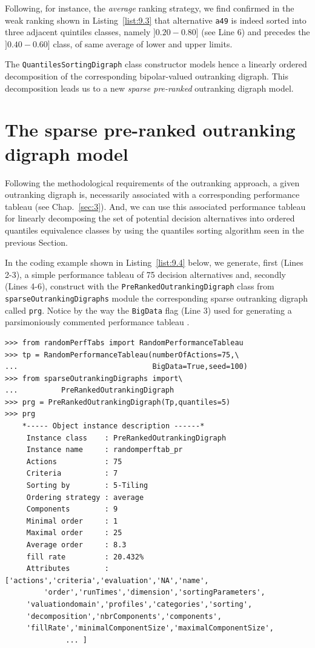 Following, for instance, the \emph{average} ranking strategy, we find confirmed in the weak ranking shown in Listing~\vref{list:9.3}  that alternative \texttt{a49}  is indeed sorted into three adjacent quintiles classes, namely $]0.20-0.80]$ (see Line 6) and precedes the $]0.40-0.60]$ class, of same average of lower and upper limits.

The \texttt{QuantilesSortingDigraph} class constructor models hence a linearly ordered decomposition of the corresponding bipolar-valued outranking digraph. This decomposition leads us to a new \emph{sparse pre-ranked} outranking digraph model.

\section{The sparse pre-ranked outranking digraph model}
\label{sec:9.3}

Following the methodological requirements of the outranking approach, a given outranking digraph is, necessarily associated with a corresponding performance tableau (see Chap.~\ref{sec:3}). And, we can use this associated performance tableau for linearly decomposing the set of potential decision alternatives into ordered quantiles equivalence classes by using the quantiles sorting algorithm seen in the previous Section. 

In the coding example shown in Listing~\vref{list:9.4} below, we generate, first (Lines 2-3), a simple performance tableau of 75 decision alternatives and, secondly (Lines 4-6), construct with the \texttt{PreRankedOutrankingDigraph} class from \texttt{sparseOut\-rankingDigraphs} module the corresponding sparse outranking digraph called \texttt{prg}. Notice by the way the \texttt{BigData} flag (Line 3) used for generating a parsimoniously commented performance tableau \citep{BIS-2021b}.
\begin{lstlisting}[caption={Computing a \emph{pre-ranked} sparse outranking digraph},label=list:9.4]
>>> from randomPerfTabs import RandomPerformanceTableau
>>> tp = RandomPerformanceTableau(numberOfActions=75,\
...                               BigData=True,seed=100)
>>> from sparseOutrankingDigraphs import\
...          PreRankedOutrankingDigraph
>>> prg = PreRankedOutrankingDigraph(Tp,quantiles=5)
>>> prg
    *----- Object instance description ------*
     Instance class    : PreRankedOutrankingDigraph
     Instance name     : randomperftab_pr
     Actions           : 75
     Criteria          : 7
     Sorting by        : 5-Tiling
     Ordering strategy : average
     Components        : 9
     Minimal order     : 1
     Maximal order     : 25
     Average order     : 8.3
     fill rate         : 20.432%
     Attributes        : ['actions','criteria','evaluation','NA','name',
         'order','runTimes','dimension','sortingParameters',
	 'valuationdomain','profiles','categories','sorting',
	 'decomposition','nbrComponents','components',
	 'fillRate','minimalComponentSize','maximalComponentSize',
              ... ]
\end{lstlisting}

